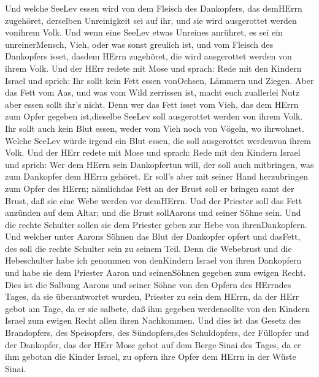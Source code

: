  Und welche SeeLev essen wird von dem Fleisch des
Dankopfers, das demHErrn zugehöret, derselben Unreinigkeit sei auf ihr,
und sie wird ausgerottet werden vonihrem Volk.  Und wenn
eine SeeLev etwas Unreines anrühret, es sei ein unreinerMensch, Vieh,
oder was sonst greulich ist, und vom Fleisch des Dankopfers isset,
dasdem HErrn zugehöret, die wird ausgerottet werden von ihrem Volk.
 Und der HErr redete mit Mose und sprach: 
Rede mit den Kindern Israel und sprich: Ihr sollt kein Fett essen
vonOchsen, Lämmern und Ziegen.  Aber das Fett vom Aas, und
was vom Wild zerrissen ist, macht euch zuallerlei Nutz aber essen sollt
ihr's nicht.  Denn wer das Fett isset vom Vieh, das dem
HErrn zum Opfer gegeben ist,dieselbe SeeLev soll ausgerottet werden von
ihrem Volk.  Ihr sollt auch kein Blut essen, weder vom Vieh
noch von Vögeln, wo ihrwohnet.  Welche SeeLev würde irgend
ein Blut essen, die soll ausgerottet werdenvon ihrem Volk. 
Und der HErr redete mit Mose und sprach:  Rede mit den
Kindern Israel und sprich: Wer dem HErrn sein Dankopfertun will, der
soll auch mitbringen, was zum Dankopfer dem HErrn gehöret. 
Er soll's aber mit seiner Hand herzubringen zum Opfer des HErrn;
nämlichdas Fett an der Brust soll er bringen samt der Brust, daß sie
eine Webe werden vor demHErrn.  Und der Priester soll das
Fett anzünden auf dem Altar; und die Brust sollAarons und seiner Söhne
sein.  Und die rechte Schulter sollen sie dem Priester
geben zur Hebe von ihrenDankopfern.  Und welcher unter
Aarons Söhnen das Blut der Dankopfer opfert und dasFett, des soll die
rechte Schulter sein zu seinem Teil.  Denn die Webebrust
und die Hebeschulter habe ich genommen von denKindern Israel von ihren
Dankopfern und habe sie dem Priester Aaron und seinenSöhnen gegeben zum
ewigen Recht.  Dies ist die Salbung Aarons und seiner Söhne
von den Opfern des HErrndes Tages, da sie überantwortet wurden, Priester
zu sein dem HErrn,  da der HErr gebot am Tage, da er sie
salbete, daß ihm gegeben werdensollte von den Kindern Israel zum ewigen
Recht allen ihren Nachkommen.  Und dies ist das Gesetz des
Brandopfers, des Speisopfers, des Sündopfers,des Schuldopfers, der
Füllopfer und der Dankopfer,  das der HErr Mose gebot auf
dem Berge Sinai des Tages, da er ihm gebotan die Kinder Israel, zu
opfern ihre Opfer dem HErrn in der Wüste Sinai.

